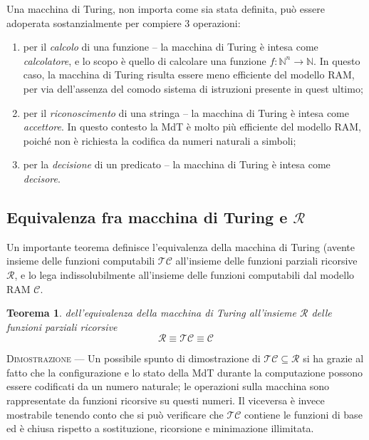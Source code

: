 \documentclass[10pt]{book}
\newtheorem{thm}{Teorema}
\begin{document}
Una macchina di Turing, non importa come sia stata definita, può essere
adoperata sostanzialmente per compiere $3$ operazioni:
\begin{enumerate}
    \item per il \emph{calcolo} di una funzione \--- la macchina di Turing è
        intesa come \emph{calcolatore}, e lo scopo è quello di calcolare una
        funzione $f: \mathbb{N}^n \rightarrow \mathbb{N}$. In questo caso, la
        macchina di Turing risulta essere meno efficiente del modello RAM, per
        via dell'assenza del comodo sistema di istruzioni presente in quest
        ultimo;
    \item per il \emph{riconoscimento} di una stringa \--- la macchina di
        Turing è intesa come \emph{accettore}. In questo contesto la MdT è
        molto più efficiente del modello RAM, poiché non è richiesta la
        codifica da numeri naturali a simboli;
    \item per la \emph{decisione} di un predicato \--- la macchina di Turing è
        intesa come \emph{decisore}.
\end{enumerate}

\subsection{Equivalenza fra macchina di Turing e $\mathcal R$}

Un importante teorema definisce l'equivalenza della macchina di Turing (avente
insieme delle funzioni computabili $\mathcal{TC}$ all'insieme delle funzioni
parziali ricorsive $\mathcal R$, e lo lega indissolubilmente all'insieme delle
funzioni computabili dal modello RAM $\mathcal C$.

\begin{thm}{dell'equivalenza della macchina di Turing all'insieme $\mathcal R$
    delle funzioni parziali ricorsive}
    $$\mathcal R \equiv \mathcal {TC} \equiv \mathcal C$$
\end{thm}

\textsc{Dimostrazione} \---- Un possibile spunto di dimostrazione di $\mathcal {TC} \subseteq \mathcal R$ si
ha grazie al fatto che la configurazione e lo stato della MdT durante la
computazione possono essere codificati da un numero naturale; le operazioni
sulla macchina sono rappresentate da funzioni ricorsive su questi numeri. Il
viceversa è invece mostrabile tenendo conto che si può verificare che
$\mathcal{TC}$ contiene le funzioni di base ed è chiusa rispetto a sostituzione,
ricorsione e minimazione illimitata.
\end{document}
